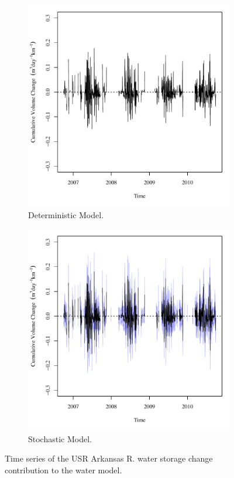 \begin{linenumbers}
\begin{figure}[htbp]
\centering
	\begin{subfigure}{0.5\textwidth}
		\centering
		\includegraphics[width=0.9\linewidth]{"Figures/Results_DUSR/Balance Water - storage"}
		\caption{Deterministic Model.}
		\label{sub:USRWaterStoreD}
	\end{subfigure}%
	\begin{subfigure}{0.5\textwidth}
		\centering
		\includegraphics[width=0.9\linewidth]{"Figures/Results_USR/Balance Water - storage"}
		\caption{Stochastic Model.}
		\label{sub:USRWaterStoreS}
	\end{subfigure}
	\caption[Time series of the USR Arkansas R. water storage change contribution to the water model.]{Time series of the USR Arkansas R. water storage change contribution to the water model.}
	\label{fig:USRWaterStore}
\end{figure}


\end{linenumbers}

